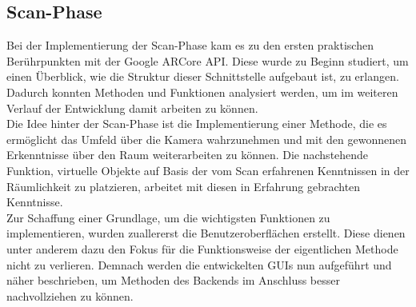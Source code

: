 \subsection{Scan-Phase} %
Bei der Implementierung der Scan-Phase kam es zu den ersten praktischen Berührpunkten mit der Google ARCore \acs{API}. Diese wurde zu Beginn studiert, 
um einen Überblick, wie die Struktur dieser Schnittstelle aufgebaut ist, zu erlangen. Dadurch konnten Methoden und Funktionen analysiert werden, um im 
weiteren Verlauf der Entwicklung damit arbeiten zu können.
\\ 
Die Idee hinter der Scan-Phase ist die Implementierung einer Methode, die es ermöglicht das Umfeld über die Kamera wahrzunehmen und mit den gewonnenen 
Erkenntnisse über den Raum weiterarbeiten zu können. Die nachstehende Funktion, virtuelle Objekte auf Basis der vom Scan erfahrenen Kenntnissen in 
der Räumlichkeit zu platzieren, arbeitet mit diesen in Erfahrung gebrachten Kenntnisse. 
\\ 
Zur Schaffung einer Grundlage, um die wichtigsten Funktionen zu implementieren, wurden zuallererst die Benutzeroberflächen erstellt. Diese dienen 
unter anderem dazu den Fokus für die Funktionsweise der eigentlichen Methode nicht zu verlieren. Demnach werden die entwickelten \acs{GUI}s nun aufgeführt 
und näher beschrieben, um Methoden des Backends im Anschluss besser nachvollziehen zu können.
